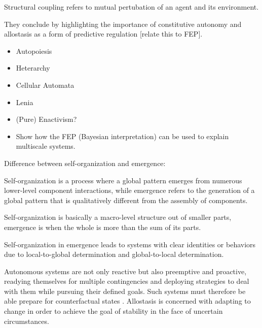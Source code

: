 Structural coupling refers to mutual pertubation of an agent and its environment.

They conclude by highlighting the importance of constitutive autonomy and allostasis as a form of predictive regulation [relate this to FEP]. 


\begin{itemize}
    \item Autopoiesis
    \item Heterarchy
\end{itemize}

\begin{itemize}
    \item Cellular Automata
    \item Lenia
    \item (Pure) Enactivism?
    \item Show how the FEP (Bayesian interpretation) can be used to explain multiscale systems.
\end{itemize}










Difference between self-organization and emergence:

Self-organization is a process where a global pattern emerges from numerous lower-level component interactions, while emergence refers to the generation of a global pattern that is qualitatively different from the assembly of components.

Self-organization is basically a macro-level structure out of smaller parts, emergence is when the whole is more than the sum of its parts.

Self-organization in emergence leads to systems with clear identities or behaviors due to local-to-global determination and global-to-local determination.


Autonomous systems are not only reactive but also preemptive and proactive, readying themselves for multiple contingencies and deploying strategies to deal with them while pursuing their defined goals. 
Such systems must therefore be able prepare for counterfactual states . 
Allostasis is concerned with adapting to change in order to achieve the goal of stability in the face of uncertain circumstances. 

